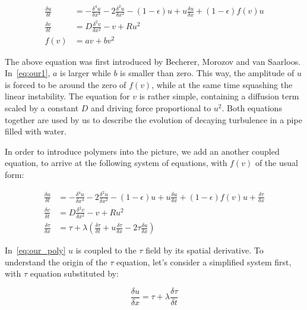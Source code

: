 \documentclass[11pt,a4paper]{article}
\begin{document}
\begin{equation}\label{eq:our1}
    \begin{split}
        \frac{\delta u}{\delta t} &= -\frac{\delta^4u}{\delta x^4} - 2\frac{\delta^2u}{\delta x^2} - (1 - \epsilon)u + u\frac{\delta u}{\delta x} + (1 - \epsilon)f(v)u \\
        \frac{\delta v}{\delta t} &= D\frac{\delta^2 v}{\delta x^2} - v + Ru^2 \\
        f(v) &= av + bv^2
\end{split}
\end{equation}

The above equation was first introduced by Becherer, Morozov and van Saarloos\cite{Morozov09}.
In~\eqref{eq:our1}, $a$ is larger while $b$ is smaller than zero.
This way, the amplitude of $u$ is forced to be around the zero of $f(v)$, while at the same time squashing the linear instability.
The equation for $v$ is rather simple, containing a diffusion term scaled by a constant $D$ and driving force proportional to $u^2$.
Both equations together are used by us to describe the evolution of decaying turbulence in a pipe filled with water.

In order to introduce polymers into the picture, we add an another coupled equation, to arrive at the following system of equations, with $f(v)$ of the usual form:


\begin{equation}\label{eq:our_poly}
    \begin{split}
        \frac{\delta u}{\delta t} &= -\frac{\delta^4u}{\delta x^4} - 2\frac{\delta^2u}{\delta x^2} - (1 - \epsilon)u + u\frac{\delta u}{\delta x} + (1 - \epsilon)f(v)u + \frac{\delta \tau}{\delta x}\\
        \frac{\delta v}{\delta t} &= D\frac{\delta^2 v}{\delta x^2} - v + Ru^2 \\
        \frac{\delta \tau}{\delta x} &= \tau + \lambda(\frac{\delta \tau}{\delta t} + u\frac{\delta \tau}{\delta x} - 2\tau\frac{\delta u}{\delta x})
\end{split}
\end{equation}

In~\eqref{eq:our_poly} $u$ is coupled to the $\tau$ field by its spatial derivative.
To understand the origin of the $\tau$ equation, let's consider a simplified system first, with $\tau$ equation substituted by:

\begin{equation}\label{eq:poly_simp}
    \frac{\delta u}{\delta x} = \tau + \lambda\frac{\delta \tau}{\delta t} 
\end{equation}
\end{document}
